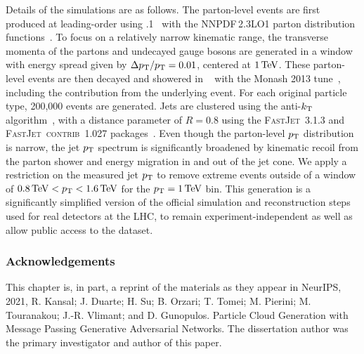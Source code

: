 Details of the simulations are as follows.
The parton-level events are first produced at leading-order using .1~\cite{Alwall:2011uj} with the NNPDF\,2.3LO1 parton distribution functions~\cite{Ball:2012cx}.
To focus on a relatively narrow kinematic range, the transverse momenta of the partons and undecayed gauge bosons are generated in a window with energy spread given by $\Delta p_\mathrm{T} / p_\mathrm{T} = 0.01$, centered at $1\,\text{Te\hspace{-.08em}V}$.
These parton-level events are then decayed and showered in ~\cite{pythia} with the Monash 2013 tune~\cite{Skands:2014pea}, including the contribution from the underlying event.
For each original particle type, 200,000 events are generated. 
Jets are clustered using the anti-$k_{\mathrm{T}}$ algorithm~\cite{Cacciari:2008gp}, with a distance parameter of $R = 0.8$ using the \textsc{FastJet}~3.1.3 and \textsc{FastJet~contrib}~1.027 packages~\cite{fastjet:1,fastjet:2}.
Even though the parton-level $p_\mathrm{T}$ distribution is narrow, the jet $p_\mathrm{T}$ spectrum is significantly broadened by kinematic recoil from the parton shower and energy migration in and out of the jet cone.
We apply a restriction on the measured jet $p_\mathrm{T}$ to remove extreme events outside of a window of $0.8\,\text{Te\hspace{-.08em}V} < p_\mathrm{T} < 1.6\,\text{Te\hspace{-.08em}V}$ for the $p_\mathrm{T} = 1\,\text{Te\hspace{-.08em}V}$ bin.
This generation is a significantly simplified version of the official simulation and reconstruction steps used for real detectors at the LHC, to remain experiment-independent as well as allow public access to the dataset.


\subsubsection{Acknowledgements}

This chapter is, in part, a reprint of the materials as they appear in
NeurIPS, 2021, R. Kansal; J. Duarte; H. Su; B. Orzari; T. Tomei; M. Pierini; M. Touranakou; J.-R. Vlimant; and D. Gunopulos. Particle Cloud Generation with Message Passing Generative Adversarial Networks.
The dissertation author was the primary investigator and author of this paper.
